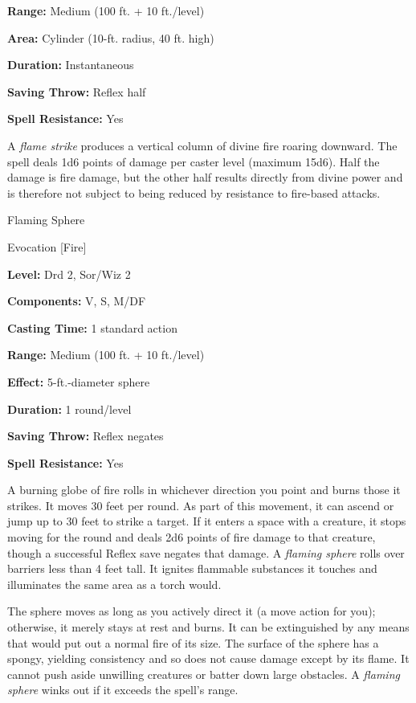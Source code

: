 \documentclass{article}
\begin{document}
\textbf{Range: }Medium (100 ft. + 10 ft./level)

\textbf{Area:} Cylinder (10-ft. radius, 40 ft. high)

\textbf{Duration:} Instantaneous

\textbf{Saving Throw:} Reflex half

\textbf{Spell Resistance:} Yes

A \textit{flame strike }produces a vertical column of divine fire roaring downward. 
The spell deals 1d6 points of damage per caster level (maximum 15d6). Half the 
damage is fire damage, but the other half results directly from divine power and 
is therefore not subject to being reduced by resistance to fire-based attacks.

\vspace{12pt}
Flaming Sphere

Evocation [Fire]

\textbf{Level:} Drd 2, Sor/Wiz 2

\textbf{Components:} V, S, M/DF

\textbf{Casting Time:} 1 standard action

\textbf{Range: }Medium (100 ft. + 10 ft./level)

\textbf{Effect:} 5-ft.-diameter sphere

\textbf{Duration:} 1 round/level

\textbf{Saving Throw:} Reflex negates

\textbf{Spell Resistance:} Yes

A burning globe of fire rolls in whichever direction you point and burns those 
it strikes. It moves 30 feet per round. As part of this movement, it can ascend 
or jump up to 30 feet to strike a target. If it enters a space with a creature, 
it stops moving for the round and deals 2d6 points of fire damage to that creature, 
though a successful Reflex save negates that damage. A \textit{flaming sphere }rolls 
over barriers less than 4 feet tall. It ignites flammable substances it touches 
and illuminates the same area as a torch would.

The sphere moves as long as you actively direct it (a move action for you); otherwise, 
it merely stays at rest and burns. It can be extinguished by any means that would 
put out a normal fire of its size. The surface of the sphere has a spongy, yielding 
consistency and so does not cause damage except by its flame. It cannot push aside 
unwilling creatures or batter down large obstacles. A \textit{flaming sphere }winks 
out if it exceeds the spell's range.
\end{document}
